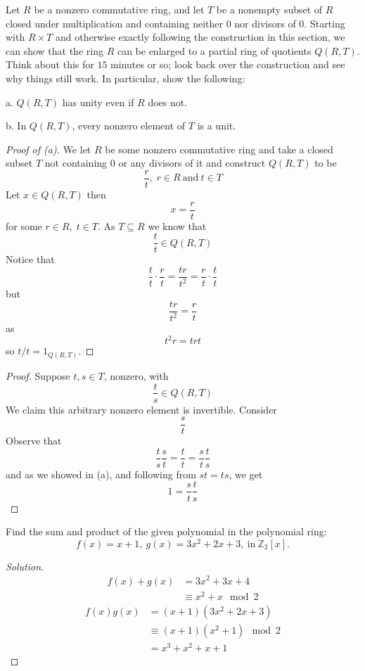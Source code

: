 \begin{prob}
    Let $R$ be a nonzero commutative ring, and let $T$ be 
    a nonempty subset of $R$ closed under multiplication and 
    containing neither $0$ nor divisors of $0$. 
    Starting with 
    $R \times T$ and otherwise exactly following the construction 
    in this section, we can show that the ring $R$ can be enlarged 
    to a partial ring of quotients $Q(R,T)$. Think about this for 
    $15$ minutes or so; look back over the construction and see 
    why things still work. In particular, show the following: 

    a. $Q(R,T)$ has unity even if $R$ does not. 

    b. In $Q(R,T)$, every nonzero element of $T$ is a unit. 
\end{prob}
\begin{proof}[Proof of (a)]
    We let $R$ be some nonzero commutative ring 
    and take a closed subset $T$ not containing $0$ or 
    any divisors of it and construct 
    $Q(R,T)$ to be 
    \[
        \frac{r}{t}, \; r \in R \ \text{and} \ t \in T
    \]
    Let $x \in Q(R,T)$ then 
    \[
        x = \frac{r}{t}
    \]
    for some $r \in R, \; t \in T$. As $T \subseteq R$ we 
    know that 
    \[
        \frac{t}{t} \in Q(R,T)
    \]
    Notice that 
    \[
        \frac{t}{t} \cdot \frac{r}{t} 
        = \frac{tr}{t^2} = 
        \frac{r}{t} \cdot \frac{t}{t}
    \]
    but 
    \[
        \frac{tr}{t^2} = \frac{r}{t}
    \]
    as 
    \[
        t^2 r = trt
    \]
    so $t/t = 1_{Q(R,T)}$. 
\end{proof}
\begin{proof}
    Suppose $t,s \in T$, nonzero, with  
    \[
        \frac{t}{s} \in Q(R,T)
    \]
    We claim this arbitrary nonzero element is invertible.
    Consider 
    \[
        \frac{s}{t}
    \]
    Observe that 
    \[
        \frac{t}{s}\frac{s}{t} = \frac{t}{t} = \frac{s}{t}\frac{t}{s}
    \]
    and as we showed in (a), and following from $st = ts$, we 
    get 
    \[
        1 = \frac{s}{t}\frac{t}{s}
    \]
\end{proof}
\begin{prob}
    Find the sum and product of the given polynomial in the 
    polynomial ring: 
    \[
        f(x) = x + 1, \: g(x) = 3x^2 + 2x + 3, \: \text{in} 
        \ \mathbb Z_2[x].
    \]
\end{prob}
\begin{proof}[Solution]
    \begin{align*}
        f(x)+g(x) &= 3x^2 + 3x + 4 \\ 
                  &\equiv x^2 + x \mod 2
    \end{align*}
    \begin{align*}
        f(x)g(x) &= (x+1)(3x^2 + 2x + 3) \\ 
                 &\equiv (x+1)(x^2 + 1) \mod 2 \\ 
                 &= x^3 + x^2 + x + 1   
    \end{align*}
\end{proof}

